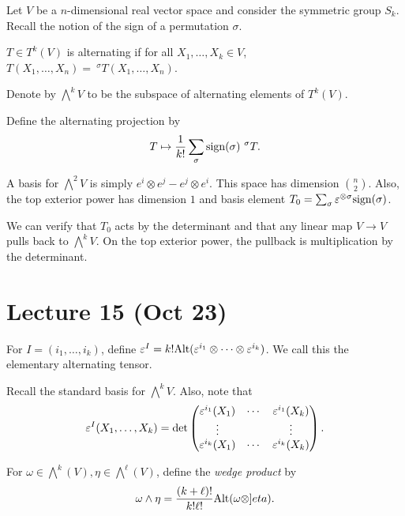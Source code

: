 \documentclass[twoside, 10pt]{article}
\begin{document}
    Let $V$ be a $n$-dimensional real vector space and consider the symmetric
    group $S_k$. Recall the notion of the sign of a permutation $\sigma$. 

    \begin{defn} $T \in T^k(V)$ is alternating if for all $X_1, \ldots,X_k \in
    V$, $T(X_1, \ldots, X_n) =\ ^{\sigma}T(X_1, \ldots, X_n)$.  \end{defn}

    Denote by $\bigwedge^kV$ to be the subspace of alternating elements of
    $T^k(V)$.

    \begin{defn} Define the alternating projection by \[ T \mapsto \frac{1}{k!}
    \sum_{\sigma} \mathrm{sign}(\sigma)\ ^{\sigma}T.\] \end{defn}

    A basis for $\bigwedge^2V$ is simply $e^i \otimes e^j - e^j \otimes e^i$.
    This space has dimension $\binom{n}{2}$. Also, the top exterior power has
    dimension $1$ and basis element $T_0 = \sum_{\sigma} \varepsilon^{\otimes \sigma}
    \mathrm{sign}(\sigma)$.

    We can verify that $T_0$ acts by the determinant and that any linear map $V
    \to V$ pulls back to $\bigwedge^kV$. On the top exterior power, the
    pullback is multiplication by the determinant.
    
    \section{Lecture 15 (Oct 23)}%
    
    \begin{notn} For $I = (i_1, \ldots, i_k)$, define $\varepsilon^I = k!
    \mathrm{Alt}(\varepsilon^{i_1} \otimes \cdots \otimes \varepsilon^{i_k})$. We call this the
elementary alternating tensor.  \end{notn}

    Recall the standard basis for $\bigwedge^k V$. Also, note that \[
        \varepsilon^I(X_1, \ldots, X_k) = \det \begin{pmatrix} \varepsilon^{i_1}(X_1) & \cdots
        & \varepsilon^{i_1}(X_k) \\ \vdots & & \vdots \\ \varepsilon^{i_k}(X_1) & \cdots &
    \varepsilon^{i_k}(X_k) \end{pmatrix}. \]

    \begin{defn} For $\omega \in \bigwedge^k(V), \eta \in \bigwedge^{\ell}(V)$,
        define the \textit{wedge product} by \[ \omega \wedge \eta =
        \frac{(k+\ell)!}{k!\ell !} \mathrm{Alt}(\omega \otimes ]eta).\] \end{defn}
\end{document}
